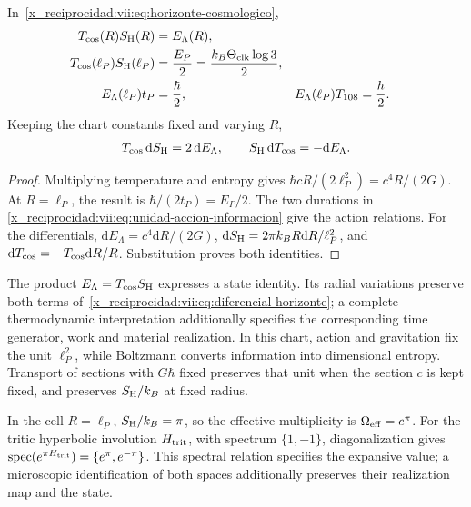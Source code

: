 \begin{theorem}
\label{x_reciprocidad:vii:thm:celda-media-accion}
In~\eqref{x_reciprocidad:vii:eq:horizonte-cosmologico},
\begin{align}
 T_{\rm cos}(R)S_{\rm H}(R)&=E_\Lambda(R),\\
 T_{\rm cos}(\ell_P)S_{\rm H}(\ell_P)
 &=\frac{E_P}{2}=\frac{k_B\Theta_{\rm clk}\log3}{2},\\
 E_\Lambda(\ell_P)t_P&=\frac{\hbar}{2},&
 E_\Lambda(\ell_P)T_{108}&=\frac h2.
 \label{x_reciprocidad:vii:eq:media-accion-horizonte}
\end{align}
Keeping the chart constants fixed and varying \(R\),
\begin{equation}
 T_{\rm cos}\,\mathrm dS_{\rm H}=2\,\mathrm dE_\Lambda,
 \qquad S_{\rm H}\,\mathrm dT_{\rm cos}=-\mathrm dE_\Lambda.
 \label{x_reciprocidad:vii:eq:diferencial-horizonte}
\end{equation}
\end{theorem}
\begin{proof}
Multiplying temperature and entropy gives
\(\hbar cR/(2\ell_P^2)=c^4R/(2G)\).
At \(R=\ell_P\), the result is
\(\hbar/(2t_P)=E_P/2\). The two durations in
\eqref{x_reciprocidad:vii:eq:unidad-accion-informacion} give the action relations.
For the differentials,
\(\mathrm dE_\Lambda=c^4\mathrm dR/(2G)\),
\(\mathrm dS_{\rm H}=2\pi k_BR\mathrm dR/\ell_P^2\), and
\(\mathrm dT_{\rm cos}=-T_{\rm cos}\mathrm dR/R\).
Substitution proves both identities.
\end{proof}

The product \(E_\Lambda=T_{\rm cos}S_{\rm H}\) expresses a
state identity. Its radial variations preserve both terms
of~\eqref{x_reciprocidad:vii:eq:diferencial-horizonte}; a complete thermodynamic interpretation
additionally specifies the corresponding time generator, work and
material realization. In this chart, action and
gravitation fix the unit \(\ell_P^2\), while Boltzmann converts
information into dimensional entropy. Transport of sections with
\(G\hbar\) fixed preserves that unit when the section \(c\) is
kept fixed, and preserves \(S_{\rm H}/k_B\) at fixed radius.

In the cell \(R=\ell_P\), \(S_{\rm H}/k_B=\pi\), so
the effective multiplicity is \(\Omega_{\rm eff}=e^\pi\).
For the tritic hyperbolic involution \(H_{\rm trit}\), with spectrum
\(\{1,-1\}\), diagonalization gives
\(\operatorname{spec}(e^{\pi H_{\rm trit}})=\{e^\pi,e^{-\pi}\}\).
This spectral relation specifies the expansive value; a microscopic
identification of both spaces additionally preserves their realization
map and the state.

